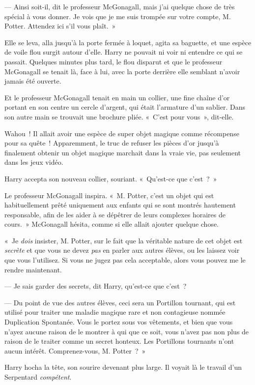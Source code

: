 --- Ainsi soit-il, dit le professeur McGonagall, mais j'ai quelque chose de très spécial à vous donner. Je vois que je me suis trompée sur votre compte, M. Potter. Attendez ici s'il vous plaît.~»

Elle se leva, alla jusqu'à la porte fermée à loquet, agita sa baguette, et une espèce de voile flou surgit autour d'elle. Harry ne pouvait ni voir ni entendre ce qui se passait. Quelques minutes plus tard, le flou disparut et que le professeur McGonagall se tenait là, face à lui, avec la porte derrière elle semblant n'avoir jamais été ouverte.

Et le professeur McGonagall tenait en main un collier, une fine chaîne d'or portant en son centre un cercle d'argent, qui était l'armature d'un sablier. Dans son autre main se trouvait une brochure pliée. «~C'est pour vous~», dit-elle.

Wahou~! Il allait avoir une espèce de super objet magique comme récompense pour sa quête~! Apparemment, le truc de refuser les pièces d'or jusqu'à finalement obtenir un objet magique marchait dans la vraie vie, pas seulement dans les jeux vidéo.

Harry accepta son nouveau collier, souriant. «~Qu'est-ce que c'est~?~»

Le professeur McGonagall inspira. «~M. Potter, c'est un objet qui est habituellement prêté uniquement aux enfants qui se sont montrés hautement responsable, afin de les aider à se dépêtrer de leurs complexes horaires de cours.~» McGonagall hésita, comme si elle allait ajouter quelque chose.

«~Je \emph{dois} insister, M. Potter, sur le fait que la véritable nature de cet objet est \emph{secrète} et que vous ne devez \emph{pas} en parler aux autres élèves, ou les laissez voir que vous l'utilisez. Si vous ne jugez pas cela acceptable, alors vous pouvez me le rendre maintenant.

--- Je sais garder des secrets, dit Harry, qu'est-ce que c'est~?

--- Du point de vue des autres élèves, ceci sera un Portillon tournant, qui est utilisé pour traiter une maladie magique rare et non contagieuse nommée Duplication Spontanée. Vous le portez sous vos vêtements, et bien que vous n'ayez aucune raison de le montrer à qui que ce soit, vous n'avez pas non plus de raison de le traiter comme un secret honteux. Les Portillons tournants n'ont aucun intérêt. Comprenez-vous, M. Potter~?~»

Harry hocha la tête, son sourire devenant plus large. Il voyait là le travail d'un Serpentard \emph{compétent}.

